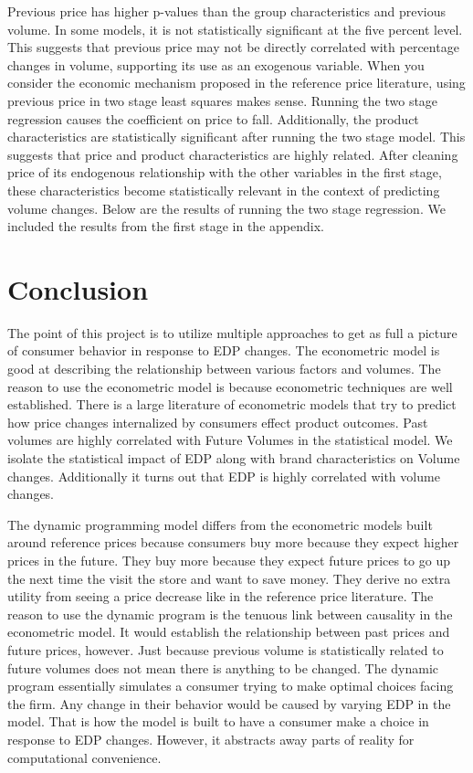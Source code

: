 \documentclass{article}
\begin{document}
Previous price has higher p-values than the group characteristics and previous volume. In some models, it is not statistically significant at the five percent level. This suggests that previous price may not be directly correlated with percentage changes in volume, supporting its use as an exogenous variable. When you consider the economic mechanism proposed in the reference price literature, using previous price in two stage least squares makes sense. Running the two stage regression causes the coefficient on price to fall. Additionally, the product characteristics are statistically significant after running the two stage model. This suggests that price and product characteristics are highly related. After cleaning price of its endogenous relationship with the other variables in the first stage, these characteristics become statistically relevant in the context of predicting volume changes. Below are the results of running the two stage regression. We included the results from the first stage in the appendix.

\section{Conclusion}

The point of this project is to utilize multiple approaches to get as full a picture of consumer behavior in response to EDP changes. The econometric model is good at describing the relationship between various factors and volumes. The reason to use the econometric model is because econometric techniques are well established. There is a large literature of econometric models that try to predict how price changes internalized by consumers effect product outcomes. Past volumes are highly correlated with Future Volumes in the statistical model. We isolate the statistical impact of EDP along with brand characteristics on Volume changes. Additionally it turns out that EDP is highly correlated with volume changes.

The dynamic programming model differs from the econometric models built around reference prices because consumers buy more because they expect higher prices in the future. They buy more because they expect future prices to go up the next time the visit the store and want to save money. They derive no extra utility from seeing a price decrease like in the reference price literature. The reason to use the dynamic program is the tenuous link between causality in the econometric model. It would establish the relationship between past prices and future prices, however. Just because previous volume is statistically related to future volumes does not mean there is anything to be changed. The dynamic program essentially simulates a consumer trying to make optimal choices facing the firm. Any change in their behavior would be caused by varying EDP in the model. That is how the model is built to have a consumer make a choice in response to EDP changes. However, it abstracts away parts of reality for computational convenience.
\end{document}
